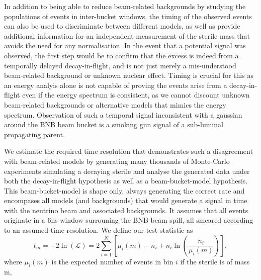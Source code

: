 \documentclass[11pt, a4paper]{article}
\begin{document}
In addition to being able to reduce beam-related backgrounds by studying the
populations of events in inter-bucket windows, the timing of the observed
events can also be used to discriminate between different models, as well as
provide additional information for an independent measurement of the sterile
mass that avoids the need for any normalisation. In the event that a  potential
signal was observed, the first step would be to confirm that the excess is
indeed from a temporally delayed decay-in-flight, and is not just merely a
mis-understood beam-related background or unknown nuclear effect. Timing is
crucial for this as an energy analyis alone is not capable of proving the
events arise from a decay-in-flight even if the energy spectrum is consistent,
as we cannot discount unknown beam-related backgrounds or alternative models
that mimics the energy spectrum. Observation of such a temporal signal
inconsistent with a gaussian around the BNB beam bucket is a smoking gun signal
of a sub-luminal propagating parent. 

We estimate the required time resolution that demonstrates such a disagreement
with beam-related models by generating many thousands of Monte-Carlo
experiments simulating a decaying sterile and analyse the generated data under
both the decay-in-flight hypothesis as well as a beam-bucket-model hypothesis.
This beam-bucket-model is shape only, always generating the correct rate and
encompases all models (and backgrounds) that would generate a signal in time
with the neutrino beam and associated backgrounds. It assumes that all events
originate in a 6ns window surrouning the BNB beam spill, all smeared according
to an assumed time resolution. We define our test statistic  as
\cite{Agashe:2014kda} \[ t_m = -2 \ln \left(\mathcal{L}\right) =  2
\sum_{i=1}^N \left[ \mu_i(m)-n_i +n_i \ln(\frac{n_i}{\mu_i(m)})  \right], \]
where $\mu_i(m)$ is the expected number of events in bin $i$ if the sterile is
of mass m,
\end{document}
